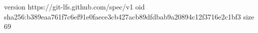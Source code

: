 version https://git-lfs.github.com/spec/v1
oid sha256:b389eaa761f7c6ef91e0faece3cb427acb89dfdbab9a20894c12f3716e2c1bf3
size 69
